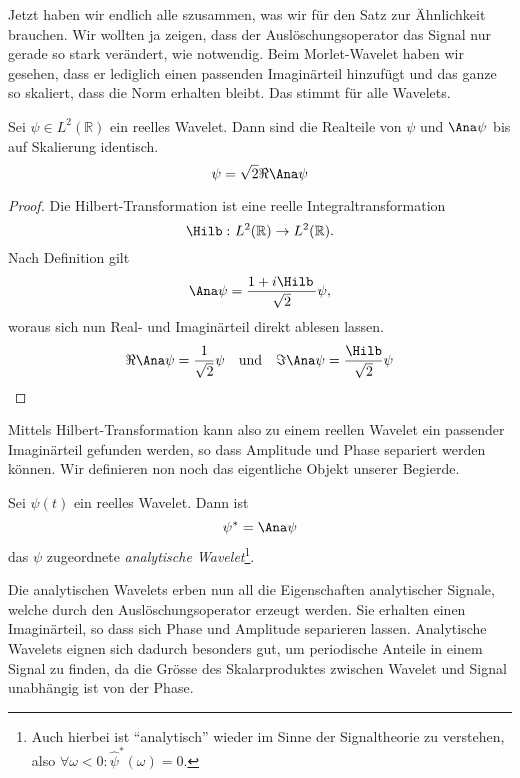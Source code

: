 Jetzt haben wir endlich alle szusammen, was wir für den Satz zur Ähnlichkeit brauchen.
Wir wollten ja zeigen, dass der Auslöschungsoperator das Signal nur gerade so stark verändert, wie notwendig.
Beim Morlet-Wavelet haben wir gesehen, dass er lediglich einen passenden Imaginärteil hinzufügt und das ganze so skaliert, dass die Norm erhalten bleibt.
Das stimmt für alle Wavelets.

\begin{satz}
	Sei $\psi \in L^2(\mathbb R)$ ein reelles Wavelet. Dann sind die Realteile von $\psi$ und $\Ana\psi$ bis auf Skalierung identisch.
	\[ \psi = \sqrt 2 \Re\Ana\psi\]
\end{satz}

\begin{proof}
	Die Hilbert-Transformation ist eine reelle Integraltransformation
	\[\Hilb\,\colon L^2(\mathbb{R}) \to L^2(\mathbb{R}).\]
	Nach Definition gilt
	\[\Ana\psi = \frac{1 + i\Hilb\,}{\sqrt 2}\psi,\]
	woraus sich nun Real- und Imaginärteil direkt ablesen lassen.
	\[\Re \Ana\psi = \frac{1}{\sqrt 2}\psi \quad \text{und}\quad \Im \Ana\psi = \frac{\Hilb }{\sqrt 2}\psi\qedhere\]
\end{proof}

Mittels Hilbert-Transformation kann also zu einem reellen Wavelet ein passender Imaginärteil gefunden werden, so dass Amplitude und Phase separiert werden können.
Wir definieren non noch das eigentliche Objekt unserer Begierde.

\begin{satz}
	\label{complex:analytic-wavelet}
	Sei $\psi(t)$ ein reelles Wavelet. Dann ist
	\begin{equation}
	\psi^\ast = \Ana\psi
	\end{equation}
	das $\psi$ zugeordnete \emph{analytische Wavelet}\footnote{Auch hierbei ist ``analytisch'' wieder im Sinne der Signaltheorie zu verstehen, also $\forall \omega < 0 \colon \hat\psi^\ast(\omega) = 0$.}.
\end{satz}

Die analytischen Wavelets erben nun all die Eigenschaften analytischer Signale, welche durch den Auslöschungsoperator erzeugt werden.
Sie erhalten einen Imaginärteil, so dass sich Phase und Amplitude separieren lassen.
Analytische Wavelets eignen sich dadurch besonders gut, um periodische Anteile in einem Signal zu finden, da die Grösse des Skalarproduktes zwischen Wavelet und Signal unabhängig ist von der Phase.
